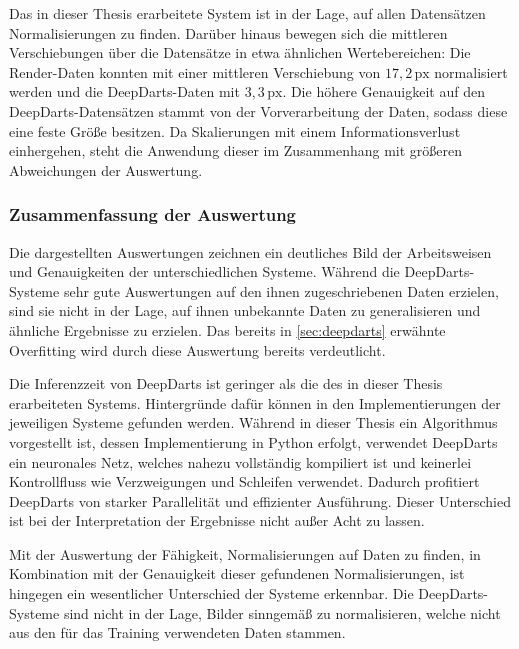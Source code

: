 Das in dieser Thesis erarbeitete System ist in der Lage, auf allen Datensätzen Normalisierungen zu finden. Darüber hinaus bewegen sich die mittleren Verschiebungen über die Datensätze in etwa ähnlichen Wertebereichen: Die Render-Daten konnten mit einer mittleren Verschiebung von $17,\!2\,\text{px}$ normalisiert werden und die DeepDarts-Daten mit $3,\!3\,\text{px}$. Die höhere Genauigkeit auf den DeepDarts-Datensätzen stammt von der Vorverarbeitung der Daten, sodass diese eine feste Größe besitzen. Da Skalierungen mit einem Informationsverlust einhergehen, steht die Anwendung dieser im Zusammenhang mit größeren Abweichungen der Auswertung.

\subsubsection{Zusammenfassung der Auswertung} %

Die dargestellten Auswertungen zeichnen ein deutliches Bild der Arbeitsweisen und Genauigkeiten der unterschiedlichen Systeme. Während die DeepDarts-Systeme sehr gute Auswertungen auf den ihnen zugeschriebenen Daten erzielen, sind sie nicht in der Lage, auf ihnen unbekannte Daten zu generalisieren und ähnliche Ergebnisse zu erzielen. Das bereits in \autoref{sec:deepdarts} erwähnte Overfitting wird durch diese Auswertung bereits verdeutlicht.

Die Inferenzzeit von DeepDarts ist geringer als die des in dieser Thesis erarbeiteten Systems. Hintergründe dafür können in den Implementierungen der jeweiligen Systeme gefunden werden. Während in dieser Thesis ein Algorithmus vorgestellt ist, dessen Implementierung in Python erfolgt, verwendet DeepDarts ein neuronales Netz, welches nahezu vollständig kompiliert ist und keinerlei Kontrollfluss wie Verzweigungen und Schleifen verwendet. Dadurch profitiert DeepDarts von starker Parallelität und effizienter Ausführung. Dieser Unterschied ist bei der Interpretation der Ergebnisse nicht außer Acht zu lassen.

Mit der Auswertung der Fähigkeit, Normalisierungen auf Daten zu finden, in Kombination mit der Genauigkeit dieser gefundenen Normalisierungen, ist hingegen ein wesentlicher Unterschied der Systeme erkennbar. Die DeepDarts-Systeme sind nicht in der Lage, Bilder sinngemäß zu normalisieren, welche nicht aus den für das Training verwendeten Daten stammen.
